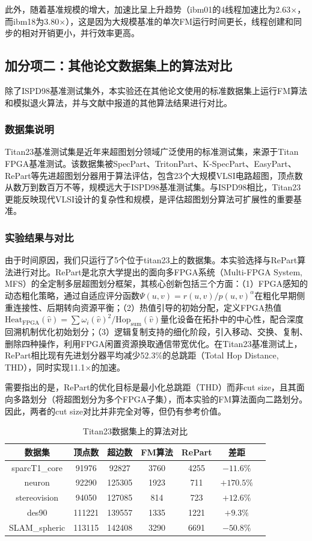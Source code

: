 \documentclass{SYSUReport}
\begin{document}
此外，随着基准规模的增大，加速比呈上升趋势（ibm01的4线程加速比为2.63$\times$，而ibm18为3.80$\times$），这是因为大规模基准的单次FM运行时间更长，线程创建和同步的相对开销更小，并行效率更高。

\subsection{加分项二：其他论文数据集上的算法对比}

除了ISPD98基准测试集外，本实验还在其他论文使用的标准数据集上运行FM算法和模拟退火算法，并与文献中报道的其他算法结果进行对比。

\subsubsection{数据集说明}
Titan23基准测试集是近年来超图划分领域广泛使用的标准测试集，来源于Titan FPGA基准测试。该数据集被SpecPart、TritonPart、K-SpecPart、EasyPart、RePart等先进超图划分器用于算法评估，包含23个大规模VLSI电路超图，顶点数从数万到数百万不等，规模远大于ISPD98基准测试集。与ISPD98相比，Titan23更能反映现代VLSI设计的复杂性和规模，是评估超图划分算法可扩展性的重要基准。

\subsubsection{实验结果与对比}
由于时间原因，我们只运行了5个位于titan23上的数据集。本实验选择与RePart\cite{repart2026}算法进行对比。RePart是北京大学提出的面向多FPGA系统（Multi-FPGA System, MFS）的全定制多层超图划分框架，其核心创新包括三个方面：（1）FPGA感知的动态粗化策略，通过自适应评分函数$\Psi(u,v) = r(u,v)/p(u,v)^{\alpha}$在粗化早期侧重连接性、后期转向资源平衡；（2）热值引导的初始分配，定义FPGA热值$\text{Heat}_{\text{FPGA}}(\hat{v}) = \sum \omega_i(\hat{v})^2 / \text{Hop}_{\text{sum}}(\hat{v})$量化设备在拓扑中的中心性，配合深度回溯机制优化初始划分；（3）逻辑复制支持的细化阶段，引入移动、交换、复制、删除四种操作，利用FPGA闲置资源换取通信带宽优化。在Titan23基准测试上，RePart相比现有先进划分器平均减少52.3\%的总跳距（Total Hop Distance, THD），同时实现11.1$\times$的加速。

需要指出的是，RePart的优化目标是最小化总跳距（THD）而非cut size，且其面向多路划分（将超图划分为多个FPGA子集），而本实验的FM算法面向二路划分。因此，两者的cut size对比并非完全对等，但仍有参考价值。

\begin{table}[H]
\centering
\caption{Titan23数据集上的算法对比}
\begin{tabular}{|c|c|c|c|c|c|c|}
\hline
数据集 & 顶点数 & 超边数 & FM算法 & RePart & 差距 \\
\hline
sparcT1\_core & 91976 & 92827 & 3760 & 4255 & $-11.6\%$ \\
\hline
neuron & 92290 & 125305 & 1923 & 711 & $+170.5\%$ \\
\hline
stereovision & 94050 & 127085 & 814 & 723 & $+12.6\%$ \\
\hline
des90 & 111221 & 139557 & 1335 & 1221 & $+9.3\%$ \\
\hline
SLAM\_spheric & 113115 & 142408 & 3290 & 6691 & $-50.8\%$ \\
\hline
\end{tabular}
\end{table}
\end{document}
